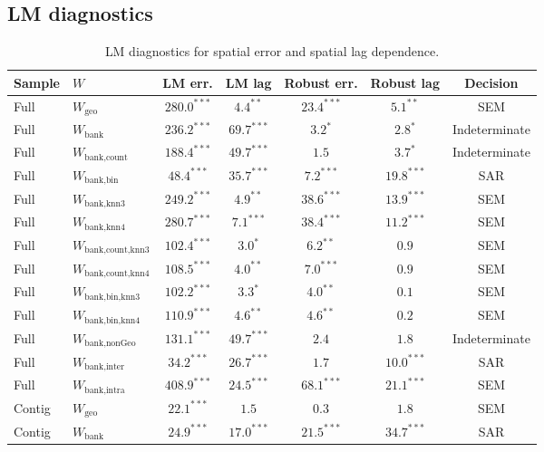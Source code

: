 \subsection{LM diagnostics}
\begin{table}[htbp]
  \centering
  \caption{LM diagnostics for spatial error and spatial lag dependence.}
  \label{tab:lm}
  \footnotesize
  \begin{tabular}{llccccc}
    \toprule
    Sample & $W$ & LM err. & LM lag & Robust err. & Robust lag & Decision \\
    \midrule
    Full & $W_{\text{geo}}$ & $280.0^{***}$ & $4.4^{**}$ & $23.4^{***}$ & $5.1^{**}$ & SEM \\
    Full & $W_{\text{bank}}$ & $236.2^{***}$ & $69.7^{***}$ & $3.2^{*}$ & $2.8^{*}$ & Indeterminate \\
    Full & $W_{\text{bank,count}}$ & $188.4^{***}$ & $49.7^{***}$ & $1.5$ & $3.7^{*}$ & Indeterminate \\
    Full & $W_{\text{bank,bin}}$ & $48.4^{***}$ & $35.7^{***}$ & $7.2^{***}$ & $19.8^{***}$ & SAR \\
    Full & $W_{\text{bank,knn3}}$ & $249.2^{***}$ & $4.9^{**}$ & $38.6^{***}$ & $13.9^{***}$ & SEM \\
    Full & $W_{\text{bank,knn4}}$ & $280.7^{***}$ & $7.1^{***}$ & $38.4^{***}$ & $11.2^{***}$ & SEM \\
    Full & $W_{\text{bank,count,knn3}}$ & $102.4^{***}$ & $3.0^{*}$ & $6.2^{**}$ & $0.9$ & SEM \\
    Full & $W_{\text{bank,count,knn4}}$ & $108.5^{***}$ & $4.0^{**}$ & $7.0^{***}$ & $0.9$ & SEM \\
    Full & $W_{\text{bank,bin,knn3}}$ & $102.2^{***}$ & $3.3^{*}$ & $4.0^{**}$ & $0.1$ & SEM \\
    Full & $W_{\text{bank,bin,knn4}}$ & $110.9^{***}$ & $4.6^{**}$ & $4.6^{**}$ & $0.2$ & SEM \\
    Full & $W_{\text{bank,nonGeo}}$ & $131.1^{***}$ & $49.7^{***}$ & $2.4$ & $1.8$ & Indeterminate \\
    Full & $W_{\text{bank,inter}}$ & $34.2^{***}$ & $26.7^{***}$ & $1.7$ & $10.0^{***}$ & SAR \\
    Full & $W_{\text{bank,intra}}$ & $408.9^{***}$ & $24.5^{***}$ & $68.1^{***}$ & $21.1^{***}$ & SEM \\
    \addlinespace
    Contig & $W_{\text{geo}}$ & $22.1^{***}$ & $1.5$ & $0.3$ & $1.8$ & SEM \\
    Contig & $W_{\text{bank}}$ & $24.9^{***}$ & $17.0^{***}$ & $21.5^{***}$ & $34.7^{***}$ & SAR \\

\end{tabular}
\end{table}

